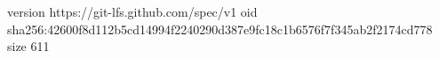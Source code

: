 version https://git-lfs.github.com/spec/v1
oid sha256:42600f8d112b5cd14994f2240290d387e9fc18c1b6576f7f345ab2f2174cd778
size 611
